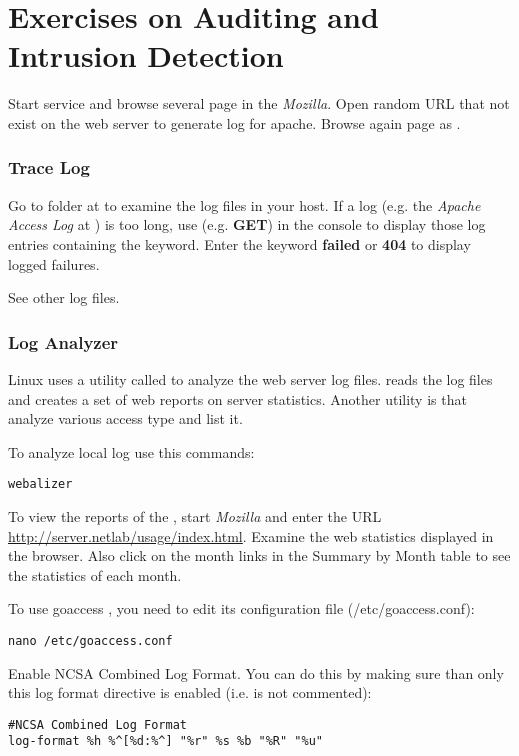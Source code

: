\documentclass{../UTNetLab}
\begin{document}
\part{Exercises on Auditing and Intrusion Detection}
Start  service and browse several page in the \textit{Mozilla}.
Open random URL that not exist on the web server to generate log for apache.
Browse again page as .

\section{Trace Log}
Go to  folder at  to examine the log files in your host.
If a log (e.g. the \textit{Apache Access Log} at ) is too long, use  (e.g. \textbf{GET}) in the {console} to display those log entries containing the keyword.
Enter the keyword \textbf{failed} or \textbf{404} to display logged failures.

See other log files.

\section{Log Analyzer}
Linux uses a utility called  to analyze the web server log files.
 reads the  log files and creates a set of web reports on server statistics.
Another utility is  that analyze various access type and list it.

To analyze local log use this commands:
\begin{lstlisting}
webalizer
    \end{lstlisting}

To view the reports of the , start \textit{Mozilla} and enter the URL \url{http://server.netlab/usage/index.html}.
Examine the web statistics displayed in the browser.
Also click on the month links in the Summary by Month table to see the statistics of each month.


To use goaccess , you need to edit its configuration file (/etc/goaccess.conf):
 \begin{lstlisting}
nano /etc/goaccess.conf
\end{lstlisting}

Enable NCSA Combined Log Format. You can do this by making sure than only this log format directive is
enabled (i.e. is not commented):
\begin{lstlisting}
#NCSA Combined Log Format
log-format %h %^[%d:%^] "%r" %s %b "%R" "%u"
\end{lstlisting}
\end{document}
